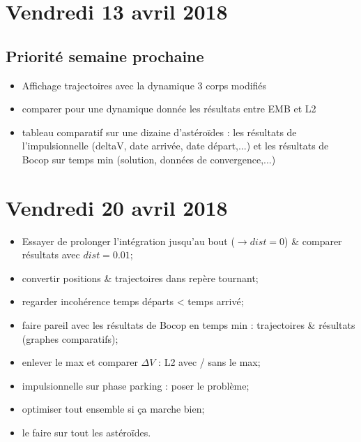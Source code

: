 \documentclass[fleqn,%
a4paper,11pt]{scrbook}
\begin{document}
\newpage
\section*{Vendredi 13 avril 2018}
\subsection*{Priorité semaine prochaine}
\begin{itemize}
	\item Affichage trajectoires avec la dynamique 3 corps modifiés
	\item comparer pour une dynamique donnée les résultats entre EMB et L2
	\item tableau comparatif sur une dizaine d'astéroïdes : les résultats de l'impulsionnelle (deltaV, date arrivée, date départ,...)  et les résultats de Bocop  sur temps min (solution, données de convergence,...)
\end{itemize}

\section*{Vendredi 20 avril 2018}
\begin{itemize}
	\item Essayer de prolonger l'intégration jusqu'au bout ($\rightarrow dist = 0$) \& comparer résultats avec $dist = 0.01$;
	\item convertir positions \& trajectoires dans repère tournant;
	\item regarder incohérence temps départs < temps arrivé;
	\item faire pareil avec les résultats de Bocop en temps min : trajectoires \& résultats (graphes comparatifs);
	\item enlever le max et comparer $\Delta V$ : L2 avec / sans le max;
	\item impulsionnelle sur phase parking : poser le problème;
	\item optimiser tout ensemble si ça marche bien;
	\item le faire sur tout les astéroïdes.
\end{itemize}
\end{document}

